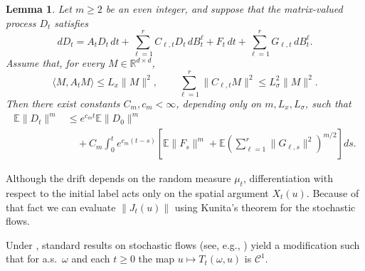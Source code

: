 \documentclass{tsp-short}
\newtheorem{lemma}{Lemma}[section]
\theoremstyle{remark}
\theoremstyle{definition}
\newcommand{\R}{\mathbb{R}} %
\newcommand{\cC}{\mathcal{C}} %
\newcommand{\E}{\mathbb E} %
\begin{document}
\begin{lemma}\label{lem:inhomogeneous-linear-moment}
	Let \(m\ge2\) be an even integer, and suppose that the
	matrix-valued process \(D_t\) satisfies
	\begin{equation*}
		dD_t = A_tD_t\,dt + \sum_{\ell=1}^{r}C_{\ell,t}D_t\,dB_t^\ell + F_t\,dt + \sum_{\ell=1}^{r}G_{\ell,t}\,dB_t^\ell.
	\end{equation*}
	Assume that, for every \(M\in\R^{d\times d}\),
	\begin{equation*}
		\langle M,A_tM\rangle \le L_x\|M\|^2, \qquad \sum_{\ell=1}^{r}\|C_{\ell,t}M\|^2 \le L_\sigma^2\|M\|^2.
	\end{equation*}
	Then there exist constants \(C_m,c_m<\infty\), depending only on
	\(m,L_x,L_\sigma\), such that
	\begin{align*}
		\E\|D_t\|^m & \le e^{c_mt}\E\|D_0\|^m                                                                                                  \\
		            & \quad +C_m\int_0^t e^{c_m(t-s)} \left[ \E\|F_s\|^m + \E\left( \sum_{\ell=1}^{r}\|G_{\ell,s}\|^2 \right)^{m/2} \right]ds.
	\end{align*}
\end{lemma}


Although the drift depends on the random measure \( \mu_t \), differentiation with respect to the initial label acts only on the spatial argument
\(X_t(u) \). Because of that fact we can evaluate \(\|J_t(u)\|\) using Kunita's theorem for the stochastic flows.

Under , standard results on stochastic flows (see, e.g., \cite[Theorem~1.4.1]{Kunita1986})
yield a modification such that for a.s.\ \(\omega\) and each \(t\ge0\) the map \(u\mapsto T_t(\omega,u)\) is \(\cC^1\).
\end{document}

